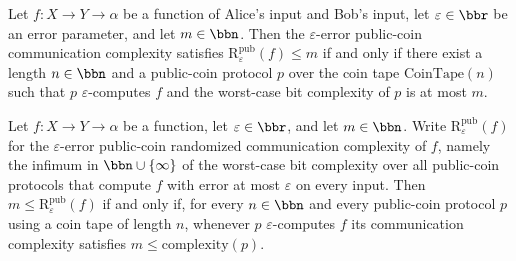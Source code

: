 \begin{theorem}
\label{CommunicationComplexity.PublicCoin.communicationComplexity_le_iff}
\leanok
{}
Let $f : X \to Y \to \alpha$ be a function of Alice's input and Bob's input, let
$\varepsilon \in \bbr$ be an error parameter, and let $m \in \bbn$. Then the
$\varepsilon$-error public-coin communication complexity satisfies
$\mathrm{R}^{\mathrm{pub}}_\varepsilon(f) \le m$ if and only if there exist a length $n
\in \bbn$ and a public-coin protocol $p$ over the coin tape $\mathrm{CoinTape}(n)$ such
that $p$ $\varepsilon$-computes $f$ and the worst-case bit complexity of $p$ is at most
$m$.
\end{theorem}

\begin{theorem}
\label{CommunicationComplexity.PublicCoin.le_communicationComplexity_iff}
\leanok
{}
Let $f : X \to Y \to \alpha$ be a function, let $\varepsilon \in \bbr$, and let $m \in
\bbn$. Write $\mathrm{R}^{\mathrm{pub}}_\varepsilon(f)$ for the $\varepsilon$-error
public-coin randomized communication complexity of $f$, namely the infimum in $\bbn \cup
\{\infty\}$ of the worst-case bit complexity over all public-coin protocols that compute
$f$ with error at most $\varepsilon$ on every input. Then $m \le
\mathrm{R}^{\mathrm{pub}}_\varepsilon(f)$ if and only if, for every $n \in \bbn$ and
every public-coin protocol $p$ using a coin tape of length $n$, whenever $p$
$\varepsilon$-computes $f$ its communication complexity satisfies $m \le
\mathrm{complexity}(p)$.
\end{theorem}


